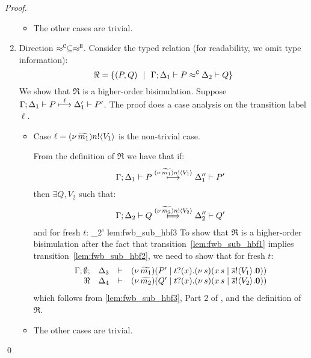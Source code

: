 \begin{proof}
\begin{enumerate}
\begin{itemize}
					\item	The other cases are trivial.
				\end{itemize}

		\item	Direction $\approx^\mathtt{C} \subseteq \approx^\mathtt{H}$.
				\noi Consider the typed relation (for readability, we omit type information):
				\[
					\Re = \{
								(P, Q) 
								\ \ |\ \ 
								\Gamma; \Delta_1 \vdash P \approx^\mathtt{C} \Delta_2 \vdash Q\}
				\]
				We show that $\Re$ is a higher-order bisimulation.
				Suppose
				$
						\Gamma; \Delta_1 \vdash P \stackrel{ \ell}{\longmapsto} \Delta_1' \vdash P'
				$.
				The proof does a case analysis on the transition label $\ell$.
				\begin{itemize}
					\item	Case $\ell = (\nu\, \widetilde{m_1}) n ! \langle V_1 \rangle$ is the non-trivial case.

							\noi From the definition of $\Re$ we have that if:
							\begin{eqnarray}
								\Gamma; \Delta_1 \vdash P \stackrel{(\nu\, \widetilde{m_1}) n ! \langle V_1 \rangle}{\longmapsto} \Delta_1'' \vdash P'
								\label{lem:fwb_sub_hbf1}
							\end{eqnarray}
							then $\exists Q, V_2$ such that:
							\begin{eqnarray}
								\horel{\Gamma}{\Delta_2}{Q}{\Hby{\news{\widetilde{m_2}} \bactout{n}{V_2}}}{\Delta_2''}{Q'}
								\label{lem:fwb_sub_hbf2}
							\end{eqnarray}
							and for fresh $t$:
								{\hwb}
								{\Delta_2'}{}
								{lem:fwb_sub_hbf3}
							\noi 
							To show that $\Re$ is a higher-order bisimulation
							after the fact that transition~\eqref{lem:fwb_sub_hbf1} implies transition~\eqref{lem:fwb_sub_hbf2},
							we need to show that for fresh $t$:
							\begin{eqnarray}
								\begin{array}{rcll} \Gamma; \emptyset; &\Delta_3& \vdash& (\nu\, \widetilde{m_1})(P' \;|\; t ? (x) . (\nu\, s)(x\, {s} \;|\; \overline{s} ! \langle V_1 \rangle . \mathbf{0}))\\ \Re &\Delta_4& \vdash &  (\nu\, \widetilde{m_2})(Q' \;|\; t ? (x) . (\nu\, s)(x\, {s} \;|\; \overline{s} ! \langle V_2 \rangle . \mathbf{0})) \end{array}
								\label{lem:fwb_sub_hbf4}
							\end{eqnarray}
							which follows from \eqref{lem:fwb_sub_hbf3}, Part 2 of ,
							and the definition of $\Re$.

					\item	The other cases are trivial.
				\end{itemize}
	\end{enumerate}
	\qed
\end{proof}



